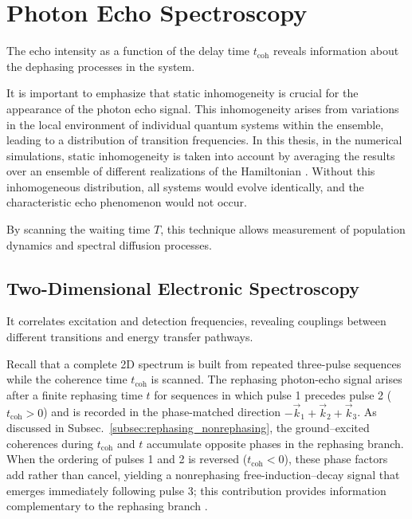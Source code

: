\section{Photon Echo Spectroscopy}
\label{sec:photon_echo}
\noindent 
The echo intensity as a function of the delay time $t_{\text{coh}}$ reveals information about the dephasing processes in the system.

\noindent 
It is important to emphasize that static inhomogeneity is crucial for the appearance of the photon echo signal. This inhomogeneity arises from variations in the local environment of individual quantum systems within the ensemble, leading to a distribution of transition frequencies. In this thesis, in the numerical simulations, static inhomogeneity is taken into account by averaging the results over an ensemble of different realizations of the Hamiltonian \cite{cho2009twodimensionalopticalspectroscopy, mukamel1995principlesnonlinearoptical}. Without this inhomogeneous distribution, all systems would evolve identically, and the characteristic echo phenomenon would not occur.

\noindent 
By scanning the waiting time $T$, this technique allows measurement of population dynamics and spectral diffusion processes.

\subsection{Two-Dimensional Electronic Spectroscopy}
\label{subsec:2d_spectroscopy}

\noindent 
It correlates excitation and detection frequencies, revealing couplings between different transitions and energy transfer pathways.

\noindent 
Recall that a complete 2D spectrum is built from repeated three-pulse sequences while the coherence time $t_{\text{coh}}$ is scanned. The rephasing photon-echo signal arises after a finite rephasing time $t$ for sequences in which pulse 1 precedes pulse 2 ($t_{\text{coh}}>0$) and is recorded in the phase-matched direction $-\vec{k}_1 + \vec{k}_2 + \vec{k}_3$. As discussed in Subsec.~\ref{subsec:rephasing_nonrephasing}, the ground–excited coherences during $t_{\text{coh}}$ and $t$ accumulate opposite phases in the rephasing branch. When the ordering of pulses 1 and 2 is reversed ($t_{\text{coh}}<0$), these phase factors add rather than cancel, yielding a nonrephasing free-induction–decay signal that emerges immediately following pulse 3; this contribution provides information complementary to the rephasing branch \cite{ginsbergetal2009twodimensionalelectronicspectroscopy}.

